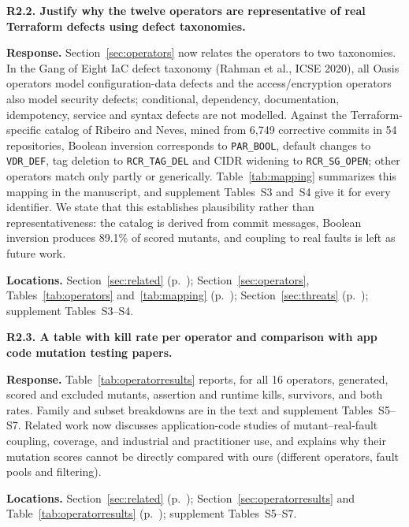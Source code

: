 \medskip
\noindent\textbf{R2.2. Justify why the twelve operators are representative of real Terraform defects using defect taxonomies.}\par
\textbf{Response.} Section~\ref{sec:operators} now relates the operators to two taxonomies. In the Gang of Eight IaC defect taxonomy (Rahman et al., ICSE 2020), all Oasis operators model configuration-data defects and the access/encryption operators also model security defects; conditional, dependency, documentation, idempotency, service and syntax defects are not modelled. Against the Terraform-specific catalog of Ribeiro and Neves, mined from 6,749 corrective commits in 54 repositories, Boolean inversion corresponds to \texttt{PAR\_BOOL}, default changes to \texttt{VDR\_DEF}, tag deletion to \texttt{RCR\_TAG\_DEL} and CIDR widening to \texttt{RCR\_SG\_OPEN}; other operators match only partly or generically. Table~\ref{tab:mapping} summarizes this mapping in the manuscript, and supplement Tables~S3 and~S4 give it for every identifier. We state that this establishes plausibility rather than representativeness: the catalog is derived from commit messages, Boolean inversion produces 89.1\% of scored mutants, and coupling to real faults is left as future work.\par
\textbf{Locations.} Section~\ref{sec:related} (p.~\pageref{sec:related}); Section~\ref{sec:operators}, Tables~\ref{tab:operators} and~\ref{tab:mapping} (p.~\pageref{tab:mapping}); Section~\ref{sec:threats} (p.~\pageref{sec:threats}); supplement Tables~S3--S4.

\medskip
\noindent\textbf{R2.3. A table with kill rate per operator and comparison with app code mutation testing papers.}\par
\textbf{Response.} Table~\ref{tab:operatorresults} reports, for all 16 operators, generated, scored and excluded mutants, assertion and runtime kills, survivors, and both rates. Family and subset breakdowns are in the text and supplement Tables~S5--S7. Related work now discusses application-code studies of mutant--real-fault coupling, coverage, and industrial and practitioner use, and explains why their mutation scores cannot be directly compared with ours (different operators, fault pools and filtering).\par
\textbf{Locations.} Section~\ref{sec:related} (p.~\pageref{sec:related}); Section~\ref{sec:operatorresults} and Table~\ref{tab:operatorresults} (p.~\pageref{tab:operatorresults}); supplement Tables~S5--S7.

